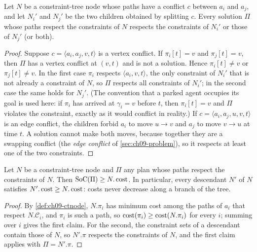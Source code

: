 \begin{lemma}
\label{thm:ch09-split}
Let $N$ be a constraint-tree node whose paths have a conflict $c$ between
$a_i$ and $a_j$, and let $N_i'$ and $N_j'$ be the two children obtained by
splitting $c$. Every solution $\Pi$ whose paths respect the constraints of
$N$ respects the constraints of $N_i'$ or those of $N_j'$ (or both).
\end{lemma}
\begin{proof}
Suppose $c = \langle a_i, a_j, v, t\rangle$ is a vertex conflict. If
$\pi_i[t] = v$ and $\pi_j[t] = v$, then $\Pi$ has a vertex conflict at
$(v,t)$ and is not a solution. Hence $\pi_i[t] \neq v$ or $\pi_j[t] \neq v$.
In the first case $\pi_i$ respects $\langle a_i, v, t\rangle$, the only
constraint of $N_i'$ that is not already a constraint of $N$, so $\Pi$
respects all constraints of $N_i'$; in the second case the same holds for
$N_j'$. (The convention that a parked agent occupies its goal is used here:
if $\pi_i$ has arrived at $\gamma_i = v$ before $t$, then $\pi_i[t] = v$ and
$\Pi$ violates the constraint, exactly as it would conflict in reality.) If
$c = \langle a_i, a_j, u, v, t\rangle$ is an edge conflict, the children
forbid $a_i$ to move $u \to v$ and $a_j$ to move $v \to u$ at time $t$. A
solution cannot make both moves, because together they are a swapping
conflict (the \emph{edge conflict} of \cref{sec:ch09-problem}), so it
respects at least one of the two constraints. \qedhere
\end{proof}

\begin{lemma}
\label{thm:ch09-lowerbound}
Let $N$ be a constraint-tree node and $\Pi$ any plan whose paths respect the
constraints of $N$. Then $\mathrm{SoC}(\Pi) \ge N.\operatorname{cost}$. In particular, every
descendant $N'$ of $N$ satisfies $N'.\operatorname{cost} \ge N.\operatorname{cost}$: costs never decrease
along a branch of the tree.
\end{lemma}
\begin{proof}
By \cref{def:ch09-ctnode}, $N.\pi_i$ has minimum cost among the paths of
$a_i$ that respect $N.\mathcal{C}_i$, and $\pi_i$ is such a path, so
$\operatorname{cost}(\pi_i) \ge \operatorname{cost}(N.\pi_i)$ for every $i$; summing over $i$ gives the
first claim. For the second, the constraint sets of a descendant contain
those of $N$, so $N'.\pi$ respects the constraints of $N$, and the first
claim applies with $\Pi = N'.\pi$. \qedhere
\end{proof}

